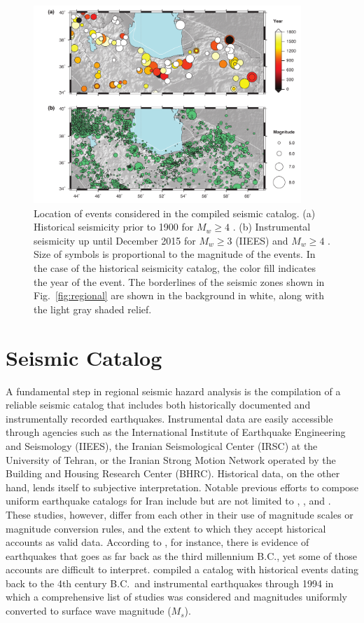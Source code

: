 
\begin{figure}[t] 
	\centering
	\includegraphics[width=0.9\textwidth]{figures/pdf/figure-03}
	\caption{Location of events considered in the compiled seismic catalog. (a) Historical seismicity prior to 1900 for $M_w \geq 4$ \citep[after][]{Zare2014}. (b) Instrumental seismicity up until December 2015 for $M_w \geq 3$ (IIEES) and $M_w \geq 4$ \citep[after][]{Zare2014}. Size of symbols is proportional to the magnitude of the events. In the case of the historical seismicity catalog, the color fill indicates the year of the event. The borderlines of the seismic zones shown in Fig.~\ref{fig:regional} are shown in the background in white, along with the light gray shaded relief.}
	\label{fig:catalog}
\end{figure}

\section{Seismic Catalog}

A fundamental step in regional seismic hazard analysis is the compilation of a reliable seismic catalog that includes both historically documented and instrumentally recorded earthquakes. Instrumental data are easily accessible through agencies such as the International Institute of Earthquake Engineering and Seismology (IIEES), the Iranian Seismological Center (IRSC) at the University of Tehran, or the Iranian Strong Motion Network operated by the Building and Housing Research Center (BHRC). Historical data, on the other hand, lends itself to subjective interpretation. Notable previous efforts to compose uniform earthquake catalogs for Iran include but are not limited to \citet{moinfar1994}, \citet{Berberian1994}, and \citet{Ambraseys2005}. These studies, however, differ from each other in their use of magnitude scales or magnitude conversion rules, and the extent to which they accept historical accounts as valid data. According to \citet{Ambraseys2005}, for instance, there is evidence of earthquakes that goes as far back as the third millennium B.C., yet some of those accounts are difficult to interpret. \citet{Mirzaei1997} compiled a catalog with historical events dating back to the 4th century B.C.~and instrumental earthquakes through 1994 in which a comprehensive list of studies was considered and magnitudes uniformly converted to surface wave magnitude ($M_s$). 

